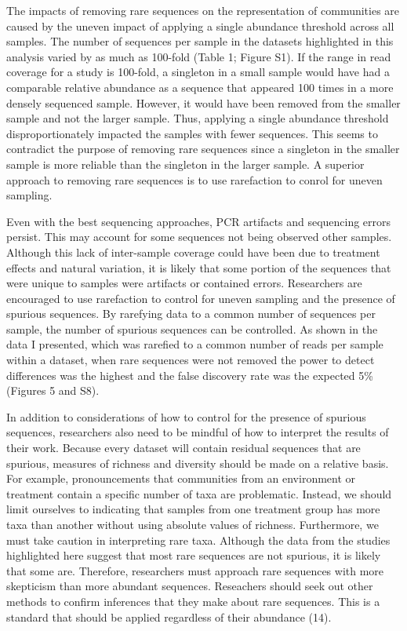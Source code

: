 \documentclass[
]{article}
\begin{document}
The impacts of removing rare sequences on the representation of
communities are caused by the uneven impact of applying a single
abundance threshold across all samples. The number of sequences per
sample in the datasets highlighted in this analysis varied by as much as
100-fold (Table 1; Figure S1). If the range in read coverage for a study
is 100-fold, a singleton in a small sample would have had a comparable
relative abundance as a sequence that appeared 100 times in a more
densely sequenced sample. However, it would have been removed from the
smaller sample and not the larger sample. Thus, applying a single
abundance threshold disproportionately impacted the samples with fewer
sequences. This seems to contradict the purpose of removing rare
sequences since a singleton in the smaller sample is more reliable than
the singleton in the larger sample. A superior approach to removing rare
sequences is to use rarefaction to conrol for uneven sampling.

Even with the best sequencing approaches, PCR artifacts and sequencing
errors persist. This may account for some sequences not being observed
other samples. Although this lack of inter-sample coverage could have
been due to treatment effects and natural variation, it is likely that
some portion of the sequences that were unique to samples were artifacts
or contained errors. Researchers are encouraged to use rarefaction to
control for uneven sampling and the presence of spurious sequences. By
rarefying data to a common number of sequences per sample, the number of
spurious sequences can be controlled. As shown in the data I presented,
which was rarefied to a common number of reads per sample within a
dataset, when rare sequences were not removed the power to detect
differences was the highest and the false discovery rate was the
expected 5\% (Figures 5 and S8).

In addition to considerations of how to control for the presence of
spurious sequences, researchers also need to be mindful of how to
interpret the results of their work. Because every dataset will contain
residual sequences that are spurious, measures of richness and diversity
should be made on a relative basis. For example, pronouncements that
communities from an environment or treatment contain a specific number
of taxa are problematic. Instead, we should limit ourselves to
indicating that samples from one treatment group has more taxa than
another without using absolute values of richness. Furthermore, we must
take caution in interpreting rare taxa. Although the data from the
studies highlighted here suggest that most rare sequences are not
spurious, it is likely that some are. Therefore, researchers must
approach rare sequences with more skepticism than more abundant
sequences. Reseachers should seek out other methods to confirm
inferences that they make about rare sequences. This is a standard that
should be applied regardless of their abundance (14).
\end{document}
